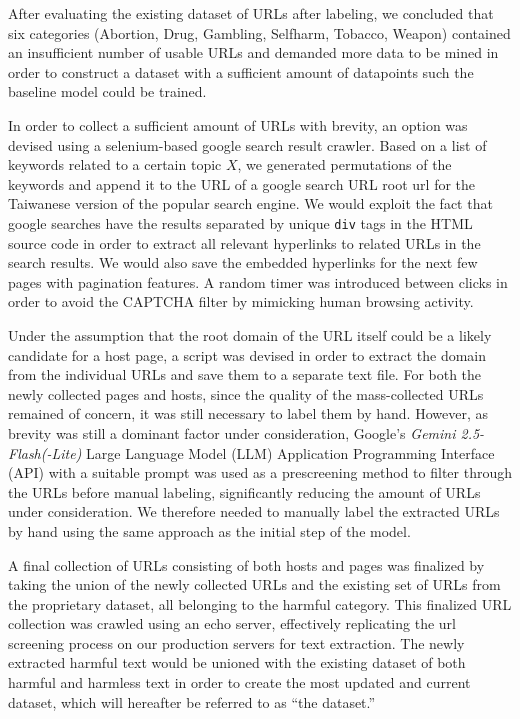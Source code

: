 \documentclass[
  titlepage]{article}
\begin{document}
After evaluating the existing dataset of URLs after labeling, we
concluded that six categories (Abortion, Drug, Gambling, Selfharm,
Tobacco, Weapon) contained an insufficient number of usable URLs and
demanded more data to be mined in order to construct a dataset with a
sufficient amount of datapoints such the baseline model could be
trained.

In order to collect a sufficient amount of URLs with brevity, an option
was devised using a selenium-based google search result crawler. Based
on a list of keywords related to a certain topic \(X\), we generated
permutations of the keywords and append it to the URL of a google search
URL root url for the Taiwanese version of the popular search engine. We
would exploit the fact that google searches have the results separated
by unique \texttt{div} tags in the HTML source code in order to extract
all relevant hyperlinks to related URLs in the search results. We would
also save the embedded hyperlinks for the next few pages with pagination
features. A random timer was introduced between clicks in order to avoid
the CAPTCHA filter by mimicking human browsing activity.

Under the assumption that the root domain of the URL itself could be a
likely candidate for a host page, a script was devised in order to
extract the domain from the individual URLs and save them to a separate
text file. For both the newly collected pages and hosts, since the
quality of the mass-collected URLs remained of concern, it was still
necessary to label them by hand. However, as brevity was still a
dominant factor under consideration, Google's \emph{Gemini
2.5-Flash(-Lite)} Large Language Model (LLM) Application Programming
Interface (API) with a suitable prompt was used as a prescreening method
to filter through the URLs before manual labeling, significantly
reducing the amount of URLs under consideration. We therefore needed to
manually label the extracted URLs by hand using the same approach as the
initial step of the model.

A final collection of URLs consisting of both hosts and pages was
finalized by taking the union of the newly collected URLs and the
existing set of URLs from the proprietary dataset, all belonging to the
harmful category. This finalized URL collection was crawled using an
echo server, effectively replicating the url screening process on our
production servers for text extraction. The newly extracted harmful text
would be unioned with the existing dataset of both harmful and harmless
text in order to create the most updated and current dataset, which will
hereafter be referred to as ``the dataset.''
\end{document}
